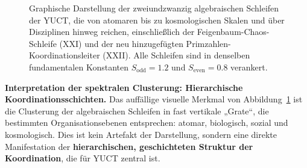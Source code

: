 \documentclass[12pt,a4paper]{article}
\begin{document}
\begin{figure}[htbp]
		\caption{Graphische Darstellung der zweiundzwanzig algebraischen Schleifen der YUCT, die von atomaren bis zu kosmologischen Skalen und über Disziplinen hinweg reichen, einschließlich der Feigenbaum-Chaos-Schleife (XXI) und der neu hinzugefügten Primzahlen-Koordinationsleiter (XXII). Alle Schleifen sind in denselben fundamentalen Konstanten $S_{\mathrm{odd}} = 1.2$ und $S_{\mathrm{even}} = 0.8$ verankert.}
		\label{fig:twentyone-loops}
	\end{figure}
	
	\vspace{0.5cm}
	\noindent
	\textbf{Interpretation der spektralen Clusterung: Hierarchische Koordinationsschichten.}
	Das auffällige visuelle Merkmal von Abbildung~\ref{fig:twentyone-loops} ist die Clusterung der algebraischen Schleifen in fast vertikale „Grate“, die bestimmten Organisationsebenen entsprechen: atomar, biologisch, sozial und kosmologisch. Dies ist kein Artefakt der Darstellung, sondern eine direkte Manifestation der \textbf{hierarchischen, geschichteten Struktur der Koordination}, die für YUCT zentral ist.
	
\end{document}
